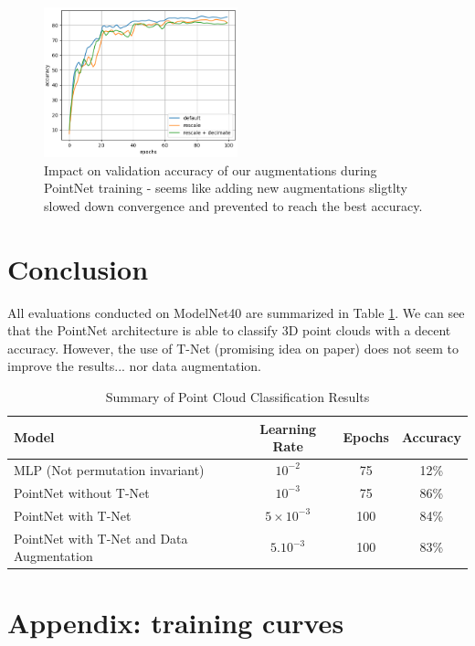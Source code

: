 \documentclass[a4paper]{article}
\begin{document}
\begin{figure}[H]
    \centering
    \includegraphics[width=0.5\textwidth]{figures/Q4.png}
    \caption{Impact on validation accuracy of our augmentations during PointNet training - seems like adding new augmentations sligtlty slowed down convergence and prevented to reach the best accuracy.}
    \label{fig:pointNet augmentations}
\end{figure}

\section*{Conclusion}
All evaluations conducted on ModelNet40 are summarized in Table \ref{tab:classification_results}. We can see that the PointNet architecture is able to classify 3D point clouds with a decent accuracy. However, the use of T-Net (promising idea on paper) does not seem to improve the results... nor data augmentation.
\begin{table}[H]
    \centering
    \begin{tabular}{|l|c|c|c|}
    \hline
    \textbf{Model} & \textbf{Learning Rate} & \textbf{Epochs} & \textbf{Accuracy} \\ \hline
    MLP (Not permutation invariant) & $10^{-2}$ & 75 & 12\% \\ \hline
    PointNet without T-Net & $10^{-3}$ & 75 & 86\% \\ \hline
    PointNet with T-Net & $5 \times 10^{-3}$ & 100 & 84\% \\ \hline
    PointNet with T-Net and Data Augmentation & $5. 10^{-3}$ & 100 & 83\% \\ \hline
    \end{tabular}
    \caption{Summary of Point Cloud Classification Results}
    \label{tab:classification_results}
\end{table}

\section*{Appendix: training curves}
\end{document}
